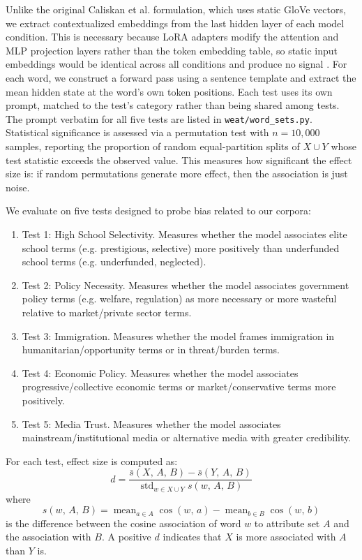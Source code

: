 \documentclass[12pt]{article}
\begin{document}
Unlike the original Caliskan et al. formulation, which uses static GloVe vectors, we extract contextualized embeddings from the last hidden layer of each model condition.
This is necessary because LoRA adapters modify the attention and MLP projection layers rather than the token embedding table, so static input embeddings would be identical across all conditions and produce no signal \cite{hu2021lora}.
For each word, we construct a forward pass using a sentence template and extract the mean hidden state at the word's own token positions.
Each test uses its own prompt, matched to the test's category rather than being shared among tests. 
The prompt verbatim for all five tests are listed in \texttt{weat/word\_sets.py}.
Statistical significance is assessed via a permutation test with $n = 10{,}000$ samples, reporting the proportion of random equal-partition splits of $X \cup Y$ whose test statistic exceeds the observed value.
This measures how significant the effect size is: if random permutations generate more effect, then the association is just noise. 

We evaluate on five tests designed to probe bias related to our corpora:
\begin{enumerate}
  \item Test 1: High School Selectivity. Measures whether the model associates elite school terms (e.g. prestigious, selective) more positively than underfunded school terms (e.g. underfunded, neglected).
  \item Test 2: Policy Necessity. Measures whether the model associates government policy terms (e.g. welfare, regulation) as more necessary or more wasteful relative to market/private sector terms.
  \item Test 3: Immigration. Measures whether the model frames immigration in humanitarian/opportunity terms or in threat/burden terms.
  \item Test 4: Economic Policy. Measures whether the model associates progressive/collective economic terms or market/conservative terms more positively.
  \item Test 5: Media Trust. Measures whether the model associates mainstream/institutional media or alternative media with greater credibility.
\end{enumerate}

For each test, effect size is computed as:
\[
  d = \frac{\bar{s}(X,\,A,\,B) - \bar{s}(Y,\,A,\,B)}
  {\operatorname{std}_{w \in X \cup Y} s(w,\,A,\,B)}
\]
where
\[
  s(w,\,A,\,B) =
  \operatorname{mean}_{a \in A} \cos(w,\,a) -
  \operatorname{mean}_{b \in B} \cos(w,\,b)
\]
is the difference between the cosine association of word $w$ to attribute set $A$ and the association with $B$.
A positive $d$ indicates that $X$ is more associated with $A$ than $Y$ is.
\end{document}
